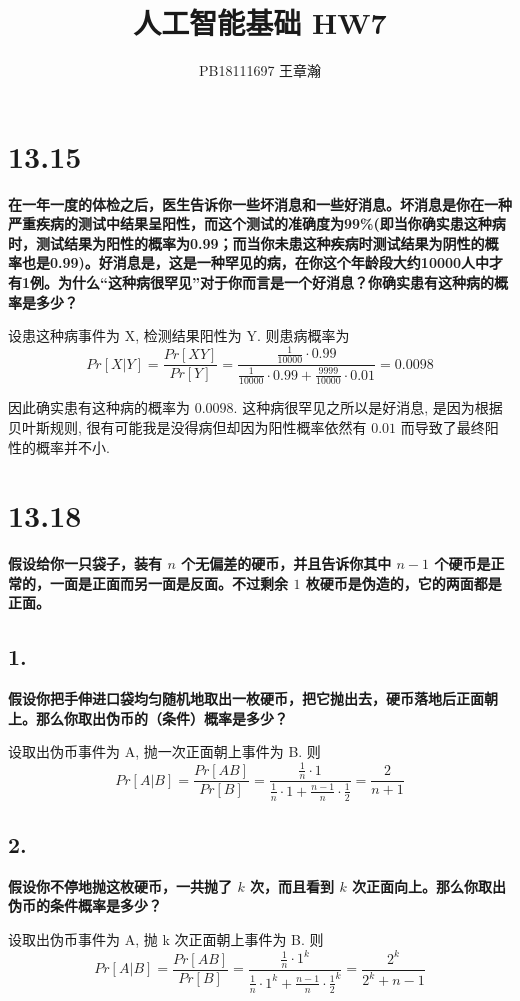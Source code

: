 \documentclass[UTF8]{article}
\title{人工智能基础 HW7}
\author{PB18111697 王章瀚}
\newcommand{\jumpLine} {\hspace*{\fill} \par}
\begin{document}
\maketitle
\section*{13.15}
\noindent \textbf{在一年一度的体检之后，医生告诉你一些坏消息和一些好消息。坏消息是你在一种严重疾病的测试中结果呈阳性，而这个测试的准确度为99\%(即当你确实患这种病时，测试结果为阳性的概率为0.99；而当你未患这种疾病时测试结果为阴性的概率也是0.99)。好消息是，这是一种罕见的病，在你这个年龄段大约10000人中才有1例。为什么“这种病很罕见”对于你而言是一个好消息？你确实患有这种病的概率是多少？} \\\jumpLine \noindent
设患这种病事件为 X, 检测结果阳性为 Y. 则患病概率为
$$Pr[X|Y]=\frac{Pr[XY]}{Pr[Y]}=\frac{\frac{1}{10000}\cdot0.99}{\frac{1}{10000}\cdot 0.99+\frac{9999}{10000}\cdot 0.01}=0.0098$$

因此确实患有这种病的概率为 $0.0098$. 这种病很罕见之所以是好消息, 是因为根据贝叶斯规则, 很有可能我是没得病但却因为阳性概率依然有 $0.01$ 而导致了最终阳性的概率并不小.

\section*{13.18}
\noindent \textbf{假设给你一只袋子，装有 $n$ 个无偏差的硬币，并且告诉你其中 $n-1$ 个硬币是正常的，一面是正面而另一面是反面。不过剩余 $1$ 枚硬币是伪造的，它的两面都是正面。}
\subsection*{1.}
\noindent \textbf{ 假设你把手伸进口袋均匀随机地取出一枚硬币，把它抛出去，硬币落地后正面朝上。那么你取出伪币的（条件）概率是多少？} \\\jumpLine \noindent
设取出伪币事件为 A, 抛一次正面朝上事件为 B. 则
$$Pr[A|B]=\frac{Pr[AB]}{Pr[B]}=\frac{\frac{1}{n}\cdot 1}{\frac{1}{n}\cdot 1 + \frac{n-1}{n}\cdot\frac{1}{2}}=\frac{2}{n+1}$$
\subsection*{2.}
\noindent \textbf{假设你不停地抛这枚硬币，一共抛了 $k$ 次，而且看到 $k$ 次正面向上。那么你取出伪币的条件概率是多少？} \\\jumpLine \noindent
设取出伪币事件为 A, 抛 k 次正面朝上事件为 B. 则
$$Pr[A|B]=\frac{Pr[AB]}{Pr[B]}=\frac{\frac{1}{n}\cdot 1^k}{\frac{1}{n}\cdot 1^k + \frac{n-1}{n}\cdot\frac{1}{2}^k}=\frac{2^k}{2^k+n-1}$$
\end{document}
